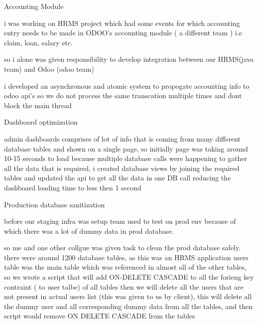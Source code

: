 \documentclass[]{deedy-resume-reversed}
\begin{document}
\begin{minipage}[t]{0.60\textwidth}
\begin{tightemize}
\item Accounting Module
\item i was working on HRMS project which had some events for which accounting entry needs to be made in ODOO's accounting module ( a different team ) i.e claim, loan, salary etc.
\item so i alone was given responsibility to develop integration between our HRMS(java team) and Odoo (odoo team)
\item i developed an asynchronous and atomic system to propogate accounting info to odoo api's so we do not process the same transcation multiple times and dont block the main thread
\item Dashboard optimization
\item admin dashboards comprises of lot of info that is coming from many different database tables and shown on a single page, so initially page was taking around 10-15 seconds to load because multiple database calls were happening to gather all the data that is required, i created database views by joining the required tables and updated the api to get all the data in one DB call reducing the dashboard loading time to less then 1 second
\item Production database sanitization
\item before our staging infra was setup team used to test on prod env because of which there was a lot of dummy data in prod database.
\item so me and one other collgue was given task to clean the prod database safely. there were around 1200 database tables, as this was an HRMS application users table was the main table which was referenced in almost all of the other tables, so we wrote a script that will add ON-DELETE CASCADE to all the forieng key contraint ( to user talbe) of all tables then we will delete all the users that are not present in actual users list (this was given to us by client), this will delete all the dummy user and all corresponding dummy data from all the tables, and then script would remove ON DELETE CASCADE from the tables


\end{tightemize}
\sectionsep


\end{minipage}
\end{document}
